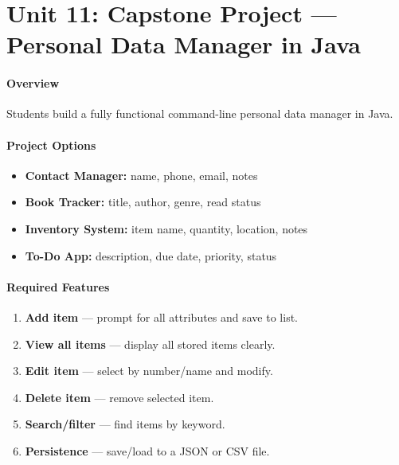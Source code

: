 \documentclass[
  justified,
  openright,
]{tufte-book}
\let\subsection\paragraph
\let\paragraph\paragraph
\let\subsection\paragraph
\let\paragraph\paragraph
\providecommand{\tightlist}{%
  \setlength{\itemsep}{0pt}\setlength{\parskip}{0pt}}
\begin{document}
\section{Unit 11: Capstone Project --- Personal Data Manager in
Java}\label{unit-11-capstone-project-personal-data-manager-in-java}

\subsection{Overview}\label{overview-25}

Students build a fully functional command-line personal data manager in
Java.

\subsection{Project Options}\label{project-options-1}

\begin{itemize}
\tightlist
\item
  \textbf{Contact Manager:} name, phone, email, notes
\item
  \textbf{Book Tracker:} title, author, genre, read status
\item
  \textbf{Inventory System:} item name, quantity, location, notes
\item
  \textbf{To-Do App:} description, due date, priority, status
\end{itemize}

\subsection{Required Features}\label{required-features-1}

\begin{enumerate}
\def\labelenumi{\arabic{enumi}.}
\tightlist
\item
  \textbf{Add item} --- prompt for all attributes and save to list.
\item
  \textbf{View all items} --- display all stored items clearly.
\item
  \textbf{Edit item} --- select by number/name and modify.
\item
  \textbf{Delete item} --- remove selected item.
\item
  \textbf{Search/filter} --- find items by keyword.
\item
  \textbf{Persistence} --- save/load to a JSON or CSV file.
\end{enumerate}
\end{document}
